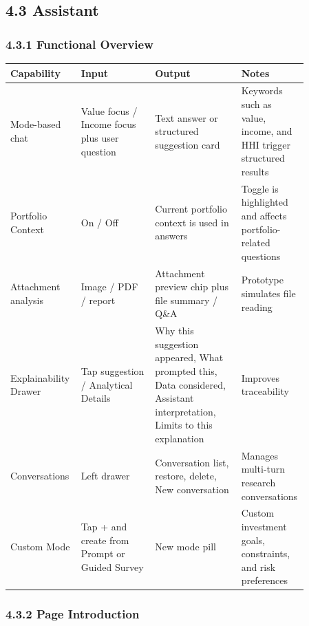 \subsection{4.3 Assistant}

\subsubsection{4.3.1 Functional Overview}

\begingroup
\small
\begin{longtable}{L{0.18\linewidth}L{0.24\linewidth}L{0.28\linewidth}L{0.16\linewidth}}
\toprule
\textbf{Capability} & \textbf{Input} & \textbf{Output} & \textbf{Notes} \\
\midrule
Mode-based chat & Value focus / Income focus plus user question & Text answer or structured suggestion card & Keywords such as value, income, and HHI trigger structured results \\
Portfolio Context & On / Off & Current portfolio context is used in answers & Toggle is highlighted and affects portfolio-related questions \\
Attachment analysis & Image / PDF / report & Attachment preview chip plus file summary / Q\&A & Prototype simulates file reading \\
Explainability Drawer & Tap suggestion / Analytical Details & Why this suggestion appeared, What prompted this, Data considered, Assistant interpretation, Limits to this explanation & Improves traceability \\
Conversations & Left drawer & Conversation list, restore, delete, New conversation & Manages multi-turn research conversations \\
Custom Mode & Tap + and create from Prompt or Guided Survey & New mode pill & Custom investment goals, constraints, and risk preferences \\
\bottomrule
\end{longtable}
\endgroup

\subsubsection{4.3.2 Page Introduction}






